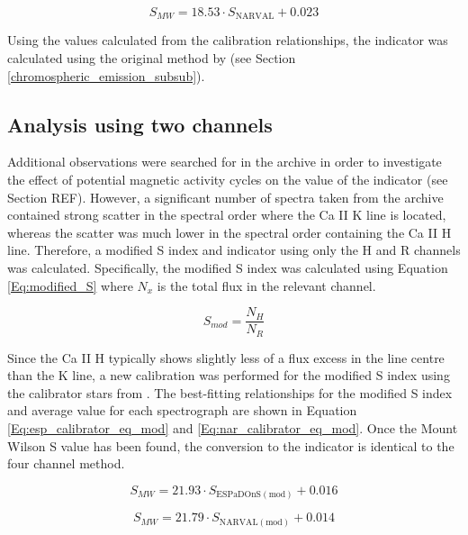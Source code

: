 \begin{equation}
S_{MW} = 18.53 \cdot S_{\mathrm{NARVAL}} + 0.023
\label{Eq:nar_calibrator_eq}
\end{equation} 

Using the \Smw values calculated from the calibration relationships, the \Rprime indicator was calculated using the original method by \citet{Noyes_etal_1984} (see Section \ref{chromospheric_emission_subsub}).

\subsection{Analysis using two channels}
\label{Chp4_data_analysis_two_channel}
Additional observations were searched for in the \esp archive in order to investigate the effect of potential magnetic activity cycles on the value of the \Rprime indicator (see Section REF). However, a significant number of spectra taken from the \esp archive contained strong scatter in the spectral order where the Ca II K line is located, whereas the scatter was much lower in the spectral order containing the Ca II H line. Therefore, a modified S index and \Rprime indicator using only the H and R channels was calculated. Specifically, the modified S index was calculated using Equation \ref{Eq:modified_S} where $N_{x}$ is the total flux in the relevant channel.

\begin{equation}
    S_{mod} = \frac{N_{H}}{N_{R}}
    \label{Eq:modified_S}
\end{equation}

Since the Ca II H typically shows slightly less of a flux excess in the line centre than the K line, a new \Smw calibration was performed for the modified S index using the calibrator stars from \citet{Duncan_etal_1991}. The best-fitting relationships for the modified S index and average \Smw value for each spectrograph are shown in Equation \ref{Eq:esp_calibrator_eq_mod} and \ref{Eq:nar_calibrator_eq_mod}. Once the Mount Wilson S value has been found, the conversion to the \Rprime indicator is identical to the four channel method.

\begin{equation}
S_{MW} = 21.93 \cdot S_{\mathrm{ESPaDOnS (mod)}}+ 0.016
\label{Eq:esp_calibrator_eq_mod}
\end{equation}

\begin{equation}
S_{MW} = 21.79 \cdot S_{\mathrm{NARVAL (mod)}} + 0.014
\label{Eq:nar_calibrator_eq_mod}
\end{equation} 

